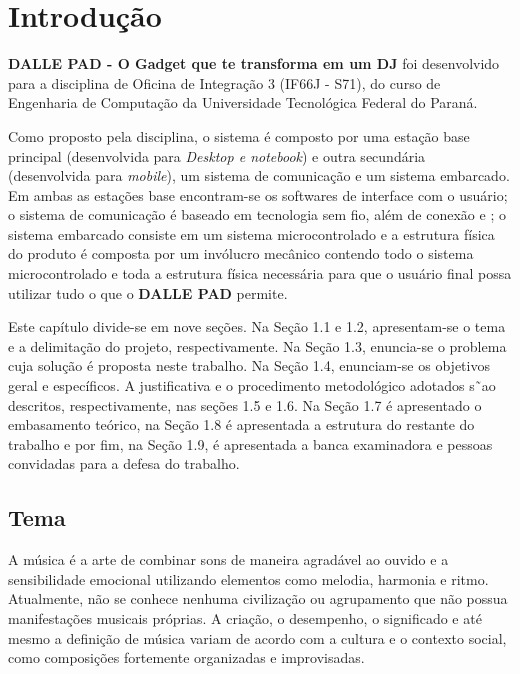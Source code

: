 
\chapter{Introdução}
\label{chap:introducao}

    \textbf{DALLE PAD - O Gadget que te transforma em um DJ} foi desenvolvido para a disciplina de Oficina de Integração 3 (IF66J - S71), do curso de Engenharia de Computação da Universidade Tecnológica Federal do Paraná.

    Como proposto pela disciplina, o sistema é composto por uma estação base principal (desenvolvida para \textit{Desktop e notebook}) e outra secundária (desenvolvida para \textit{mobile}), um sistema de comunicação e um sistema embarcado. Em ambas as estações base encontram-se os softwares de interface com o usuário; o sistema de comunicação é baseado em tecnologia sem fio, além de conexão  e ; o sistema embarcado consiste em um sistema microcontrolado e a estrutura física do produto é composta por um invólucro mecânico contendo todo o sistema microcontrolado e toda a estrutura física necessária para que o usuário final possa utilizar tudo o que o \textbf{DALLE PAD} permite.

    Este capítulo divide-se em nove seções. Na Seção 1.1 e 1.2, apresentam-se o tema e a delimitação do projeto, respectivamente. Na Seção 1.3, enuncia-se o problema cuja solução é proposta neste trabalho. Na Seção 1.4, enunciam-se os objetivos geral e específicos. A justificativa e o procedimento metodológico adotados s˜ao descritos, respectivamente, nas seções 1.5 e 1.6. Na Seção 1.7 é apresentado o embasamento teórico, na Seção 1.8 é apresentada a estrutura do restante do trabalho e por fim, na Seção 1.9, é apresentada a banca examinadora e pessoas convidadas para a defesa do trabalho.

    \section{Tema}

        A música é a arte de combinar sons de maneira agradável ao ouvido e a sensibilidade emocional utilizando elementos como melodia, harmonia e ritmo. Atualmente, não se conhece nenhuma civilização ou agrupamento que não possua manifestações musicais próprias. A criação, o desempenho, o significado e até mesmo a definição de música variam de acordo com a cultura e o contexto social, como composições fortemente organizadas e improvisadas.

